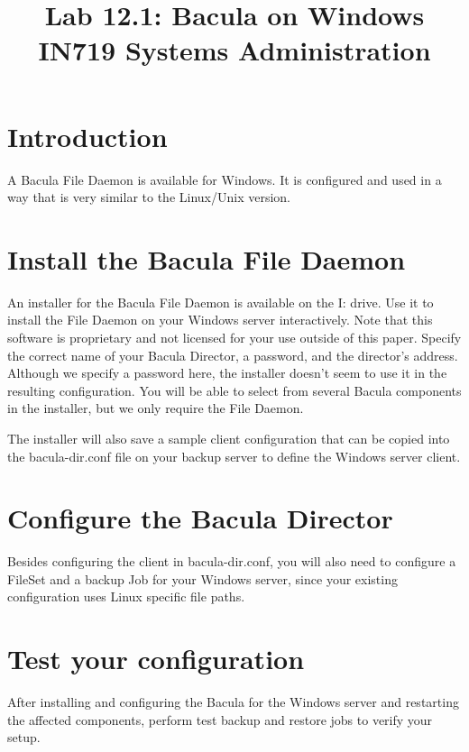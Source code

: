 \documentclass{article}   	%
\title{Lab 12.1:  Bacula on Windows\\ IN719 Systems Administration}
\date{}							%
\begin{document}
\maketitle

\section*{Introduction}
A Bacula File Daemon is available for Windows. It is configured and used in a way that is very similar to the Linux/Unix version.

\section{Install the Bacula File Daemon}
An installer for the Bacula File Daemon is available on the I: drive.  Use it to install the File Daemon on your Windows server interactively.  Note that this software is proprietary and not licensed for your use outside of this paper.  Specify the correct name of your Bacula Director, a password, and the director's address.  Although we specify a password here, the installer doesn't seem to use it in the resulting configuration.  You will be able to select from several Bacula components in the installer, but we only require the File Daemon.

The installer will also save a sample client configuration that can be copied into the bacula-dir.conf file on your backup server to define the Windows server client.

\section{Configure the Bacula Director}
Besides configuring the client in bacula-dir.conf, you will also need to configure a FileSet and a backup Job for your Windows server, since your existing configuration uses Linux specific file paths.

\section{Test your configuration}
After installing and configuring the Bacula for the Windows server and restarting the affected components, perform test backup and restore jobs to verify your setup.
\end{document}
